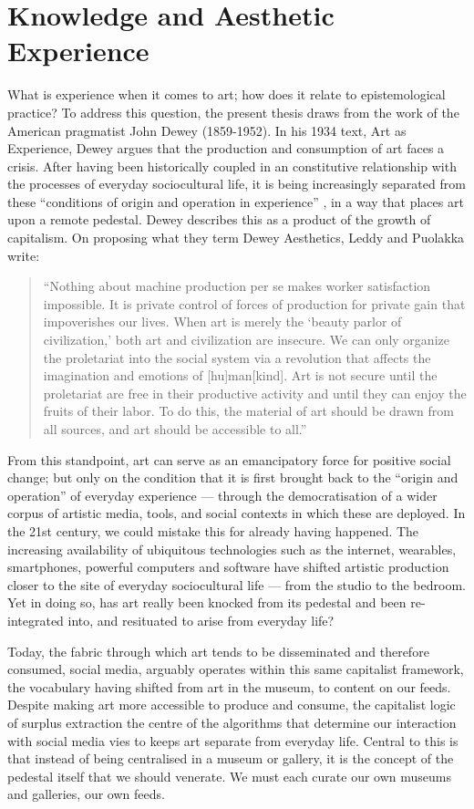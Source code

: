 \section{Knowledge and Aesthetic Experience}\label{sec: theory-aestheticexperience}
What is experience when it comes to art; how does it relate to epistemological practice? To address this question, the present thesis draws from the work of the American pragmatist John Dewey (1859-1952). In his 1934 text, Art as Experience, Dewey argues that the production and consumption of art faces a crisis. After having been historically coupled in an constitutive relationship with the processes of everyday sociocultural life, it is being increasingly separated from these “conditions of origin and operation in experience” \citep{dewey1934}, in a way that places art upon a remote pedestal. Dewey describes this as a product of the growth of capitalism. On proposing what they term Dewey Aesthetics, Leddy and Puolakka write:
\begin{quote}
    “Nothing about machine production per se makes worker satisfaction impossible. It is private control of forces of production for private gain that impoverishes our lives. When art is merely the ‘beauty parlor of civilization,’ both art and civilization are insecure. We can only organize the proletariat into the social system via a revolution that affects the imagination and emotions of [hu]man[kind]. Art is not secure until the proletariat are free in their productive activity and until they can enjoy the fruits of their labor. To do this, the material of art should be drawn from all sources, and art should be accessible to all.” \citep{leddy2021}
\end{quote}
From this standpoint, art can serve as an emancipatory force for positive social change; but only on the condition that it is first brought back to the “origin and operation” of everyday experience — through the democratisation of a wider corpus of artistic media, tools, and social contexts in which these are deployed. In the 21st century, we could mistake this for already having happened. The increasing availability of ubiquitous technologies such as the internet, wearables, smartphones, powerful computers and software have shifted artistic production closer to the site of everyday sociocultural life — from the studio to the bedroom. Yet in doing so, has art really been knocked from its pedestal and been re-integrated into, and resituated to arise from everyday life? 

Today, the fabric through which art tends to be disseminated and therefore consumed, social media, arguably operates within this same capitalist framework, the vocabulary having shifted from art in the museum, to content on our feeds. Despite making art more accessible to produce and consume, the capitalist logic of surplus extraction the centre of the algorithms that determine our interaction with social media vies to keeps art separate from everyday life. Central to this is that instead of being centralised in a museum or gallery, it is the concept of the pedestal itself that we should venerate. We must each curate our own museums and galleries, our own feeds.

